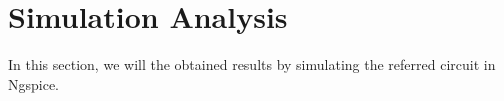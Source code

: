 \newpage

\section{Simulation Analysis}
\label{sec:simulation}

In this section, we will the obtained results by simulating the referred circuit in Ngspice. 







